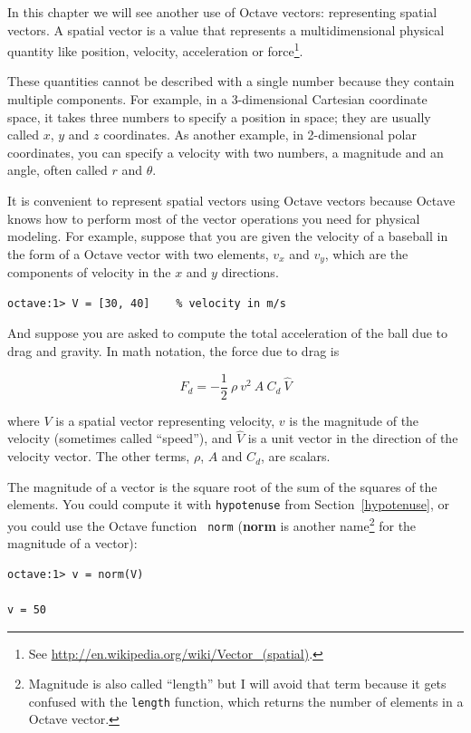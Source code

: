 \documentclass{book}
\begin{document}
In this chapter we will see another use of Octave vectors:
representing spatial vectors. A spatial vector is a value that
represents a multidimensional physical quantity like position,
velocity, acceleration or force\footnote{See
\url{http://en.wikipedia.org/wiki/Vector_(spatial)}.}.

These quantities cannot be described with a
single number because they contain multiple components. For example,
in a 3-dimensional Cartesian coordinate space, it takes three numbers
to specify a position in space; they are usually called $x$, $y$ and
$z$ coordinates. As another example, in 2-dimensional polar
coordinates, you can specify a velocity with two numbers, a
magnitude and an angle, often called $r$ and $\theta$.

It is convenient to represent spatial vectors using Octave vectors
because Octave knows how to perform most of the vector
operations you need for physical modeling. For example,
suppose that you are given the velocity of a baseball in
the form of a Octave vector with two elements, $v_x$ and $v_y$,
which are the components of velocity in the $x$ and $y$ directions.

\begin{verbatim}
octave:1> V = [30, 40]    % velocity in m/s
\end{verbatim}

And suppose you are asked to compute the total acceleration of
the ball due to drag and gravity. In math notation, the force
due to drag is

\[ F_d = -\frac{1}{2} ~ \rho ~ v^2 ~ A ~ C_d ~ \hat{V}  \]

where $V$ is a spatial vector representing velocity, $v$ is the magnitude
of the velocity (sometimes called ``speed''), and $\hat{V}$ is a unit
vector in the direction of the velocity vector. The other terms,
$\rho$, $A$ and $C_d$, are scalars.

The magnitude of a vector is the square root of the sum of the squares
of the elements. You could compute it with {\tt hypotenuse} from
Section~\ref{hypotenuse}, or you could use the Octave function {\tt
norm} ({\bf norm} is another name\footnote{Magnitude is also called
``length'' but I will avoid that term because it gets confused with
the {\tt length} function, which returns the number of elements in a
Octave vector.} for the magnitude of a vector):

\begin{verbatim}
octave:1> v = norm(V)

v = 50
\end{verbatim}
\end{document}
